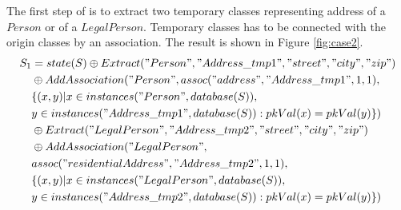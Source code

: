 \documentclass[11pt]{article}
\begin{document}
The first  step of is to extract two temporary classes representing address of a $Person$ or of a $LegalPerson$. Temporary classes has to be connected with the origin classes by an association. The result is shown in Figure \ref{fig:case2}.
\begin{align*}
S_1 & = state(S) \oplus Extract("Person", "Address\_tmp1", "street", "city", "zip") \\
& \oplus AddAssociation("Person", assoc("address", "Address\_tmp1", 1, 1),\\ 
& \{(x,y)| x \in instances("Person", database(S)), \\
& y \in instances("Address\_tmp1", database(S)) : pkVal(x) = pkVal(y) \}) \\
& \oplus Extract("LegalPerson", "Address\_tmp2", "street", "city", "zip")  \\
& \oplus AddAssociation("LegalPerson", \\ 
& assoc("residentialAddress", "Address\_tmp2", 1, 1),\\ 
& \{(x,y)| x \in instances("LegalPerson", database(S)), \\
& y \in instances("Address\_tmp2", database(S)) : pkVal(x) = pkVal(y) \}) \\
\end{align*}
\end{document}
